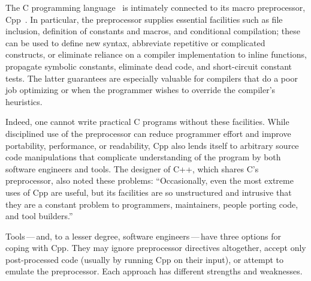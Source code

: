 \documentclass[11pt]{article}
\begin{document}
The C programming language~\cite{ansi} is intimately connected to its
macro preprocessor, Cpp~\cite[Ch.~3]{Harbison91}.  In particular, the
preprocessor supplies essential facilities such as file inclusion,
definition of constants and macros, and conditional compilation; these
can be used to define new syntax, abbreviate repetitive or complicated
constructs, or eliminate reliance on a compiler implementation to
inline functions, propagate symbolic constants, eliminate dead code,
and short-circuit constant tests.  The latter guarantees are
especially valuable for compilers that do a poor job optimizing or
when the programmer wishes to override the compiler's heuristics.  

Indeed, one cannot write practical C programs without these
facilities.  While disciplined use of the preprocessor can reduce
programmer effort and improve portability, performance, or
readability, Cpp also lends itself to arbitrary source code
manipulations that complicate understanding of the program by both
software engineers and tools.  The designer of C++, which shares C's
preprocessor, also noted these problems: ``Occasionally, even the most
extreme uses of Cpp are useful, but its facilities are so unstructured
and intrusive that they are a constant problem to programmers,
maintainers, people porting code, and tool
builders.''~\cite[p.~424]{Stroustrup-DesignEvolution}

Tools\,---\,and, to a lesser degree, software engineers\,---\,have
three options for coping with Cpp.  They may ignore preprocessor
directives altogether, accept only post-processed code (usually by
running Cpp on their input), or attempt to emulate the preprocessor.
Each approach has different strengths and weaknesses.
\end{document}
